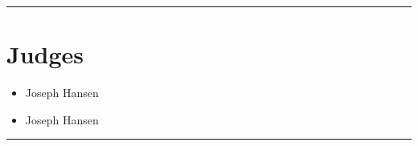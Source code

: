 \documentclass[10pt]{article}
\begin{document}
\vspace{0.5cm}
	\hrule
	\vspace{0.5cm}
		\section*{\faUsers \: Judges}

		

	\begin{multicols}{2}

		\begin{itemize}
									\item Joseph Hansen
						\end{itemize}

		\vfill\null
		\columnbreak

		\begin{itemize}
									\item Joseph Hansen
						\end{itemize}

		\vfill\null

		\end{multicols}



			\vspace{0.5cm}
	\hrule
	\vspace{0.5cm}
\end{document}
